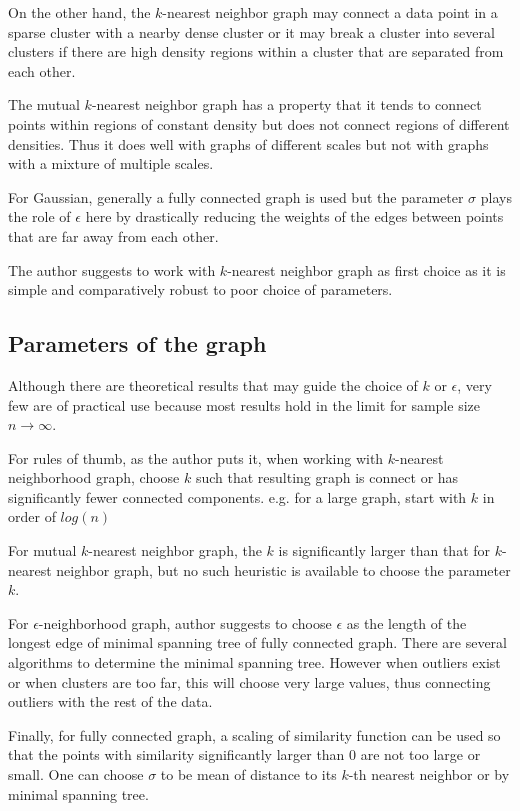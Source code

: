 \documentclass[10pt,a4paper, nocenter]{report}
\begin{document}
	On the other hand, the $k$-nearest neighbor graph may connect a data point in a sparse cluster with a nearby dense cluster or it may break a cluster into several clusters if there are high density regions within a cluster that are separated from each other.
	
	The mutual $k$-nearest neighbor graph has a property that it tends to connect points within regions of constant density but does not connect regions of different densities. Thus it does well with graphs of different scales but not with graphs with a mixture of multiple scales. 
	
	For Gaussian, generally a fully connected graph is used but the parameter $\sigma$ plays the role of $\epsilon$ here by drastically reducing the weights of the edges between points that are far away from each other.
	
	The author suggests to work with $k$-nearest neighbor graph as first choice as it is simple and comparatively robust to poor choice of parameters.
	
	\subsection{Parameters of the graph}
	Although there are theoretical results that may guide the choice of $k$ or $\epsilon$, very few are of practical use because most results hold in the limit for sample size $n \to \infty$.
	
	For rules of thumb, as the author puts it, when working with $k$-nearest neighborhood graph, choose $k$ such that resulting graph is connect or has significantly fewer connected components. e.g. for a large graph, start with $k$ in order of $log(n)$
	
	For mutual $k$-nearest neighbor graph, the $k$ is significantly larger than that for $k$-nearest neighbor graph, but no such heuristic is available to choose the parameter $k$.
	
	For $\epsilon$-neighborhood graph, author suggests to choose $\epsilon$ as the length of the longest edge of minimal spanning tree of fully connected graph. There are several algorithms to determine the minimal spanning tree. However when outliers exist or when clusters are too far, this will choose very large values, thus connecting outliers with the rest of the data. 
	
	Finally, for fully connected graph, a scaling of similarity function can be used so that the points with similarity significantly larger than 0 are not too large or small. One can choose $\sigma$ to be mean of distance to its $k$-th nearest neighbor or by minimal spanning tree. 
	
\end{document}
